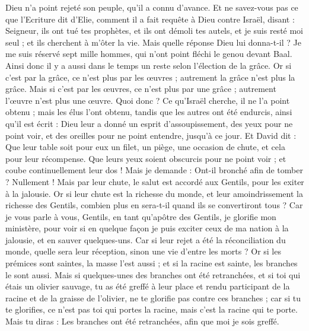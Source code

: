 \begin{multicols}{2}
Dieu n'a point rejeté son peuple, qu’il a connu d’avance. Et ne savez-vous pas ce que l'Ecriture dit d'Elie, comment il a fait requête à Dieu contre Israël, disant :
Seigneur, ils ont tué tes prophètes, et ils ont démoli tes autels, et je suis resté moi seul ; et ils cherchent à m'ôter la vie.
Mais quelle réponse Dieu lui donna-t-il ? Je me suis réservé sept mille hommes, qui n'ont point fléchi le genou devant Baal.
Ainsi donc il y a aussi dans le temps un reste selon l'élection de la grâce.
Or si c'est par la grâce, ce n'est plus par les œuvres ; autrement la grâce n'est plus la grâce. Mais si c'est par les œuvres, ce n'est plus par une grâce ; autrement l’œuvre n'est plus une œuvre.
Quoi donc ? Ce qu'Israël cherche, il ne l'a point obtenu ; mais les élus l’ont obtenu, tandis que les autres ont été endurcis,
ainsi qu'il est écrit : Dieu leur a donné un esprit d’assoupissement, des yeux pour ne point voir, et des oreilles pour ne point entendre, jusqu’à ce jour. Et David dit :
Que leur table soit pour eux un filet, un piège, une occasion de chute, et cela pour leur récompense.
Que leurs yeux soient obscurcis pour ne point voir ; et coube continuellement leur dos !
Mais je demande : Ont-il bronché afin de tomber ? Nullement ! Mais par leur chute, le salut est accordé aux Gentils, pour les exiter à la jalousie.
Or si leur chute est la richesse du monde, et leur amoindrissement la richesse des Gentils, combien plus en sera-t-il quand ils se convertiront tous ?
Car je vous parle à vous, Gentils, en tant qu’apôtre des Gentils, je glorifie mon ministère,
pour voir si en quelque façon je puis exciter ceux de ma nation à la jalousie, et en sauver quelques-uns.
Car si leur rejet a été la réconciliation du monde, quelle sera leur réception, sinon une vie d’entre les morts ?
Or si les prémices sont saintes, la masse l'est aussi ; et si la racine est sainte, les branches le sont aussi.
Mais si quelques-unes des branches ont été retranchées, et si toi qui étais un olivier sauvage, tu as été greffé à leur place et rendu participant de la racine et de la graisse de l'olivier,
ne te glorifie pas contre ces branches ; car si tu te glorifies, ce n'est pas toi qui portes la racine, mais c'est la racine qui te porte.
Mais tu diras : Les branches ont été retranchées, afin que moi je sois greffé.

\end{multicols}
